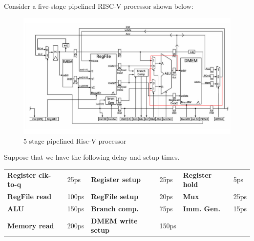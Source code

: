 \documentclass[addpoints, 12pt, answers]{exam}
\begin{document}
\begin{questions}
Consider a five-stage pipelined RISC-V processor shown below:
\begin{figure}[h]
    \centering
    \includegraphics[width=\linewidth]{pipeline.pdf}
    \caption*{5 stage pipelined Risc-V processor}
    \label{fig:pipelined}
\end{figure}

Suppose that we have the following delay and setup times.

\begin{table}[h]
    \centering
    \begin{tabular}{l l l l l l}
    {\bf Register clk-to-q} & 25ps & {\bf Register setup}  & 25ps & {\bf Register hold}  & 5ps \\
    {\bf RegFile read}  & 100ps & {\bf RegFile setup} & 20ps & {\bf Mux} & 25ps \\
    {\bf ALU} & 150ps & {\bf Branch comp.} & 75ps & {\bf Imm. Gen.} & 15ps \\
    {\bf Memory read} & 200ps & {\bf DMEM write setup} & 150ps\\
    \end{tabular}
    \label{tab:delay_time}
\end{table}

\end{questions}
\end{document}
